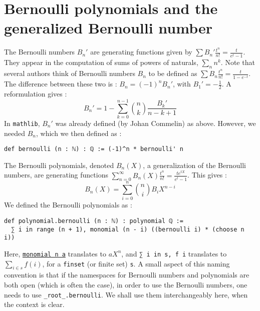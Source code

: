 \documentclass[a4paper,UKenglish,cleveref, autoref, thm-restate,pdfa]{lipics-v2021}
\newcommand{\lean}[1]{\texttt{#1}\xspace} %
\begin{document}
\section{Bernoulli polynomials and the generalized Bernoulli number}
\label{ber}
The Bernoulli numbers $B_n'$ are generating functions given by $\sum B_n'\frac{t^n}{n!}=\frac{t}{e^{t} - 1}$. They appear 
in the computation of sums of powers of naturals, $\sum_n n^k$. Note that several authors think of Bernoulli numbers $B_n$ 
to be defined as $\sum B_n\frac{t^n}{n!}=\frac{t}{1-e^{-t}}$. The difference between these two is : $B_n = (-1)^n B_n'$, 
with $B_1' = - \frac{1}{2}$.
A reformulation gives :
$$ B_n' = 1 - \sum_{k = 0}^{n - 1} {n \choose k} \frac{B_k'}{n - k + 1} $$
In \lean{mathlib}, $B_n'$ was already defined (by Johan Commelin) as above. However, we needed $B_n$, which we then defined as :
\begin{lstlisting}
def bernoulli (n : ℕ) : ℚ := (-1)^n * bernoulli' n
\end{lstlisting}
The Bernoulli polynomials, denoted $B_n(X)$, a generalization of the Bernoulli numbers,
are generating functions $ \sum_{n = 0}^{\infty} B_n(X) \frac{t^n}{n!} = \frac{t e^{tX}}{e^t - 1} $. 
This gives :
$$ B_n (X) = \sum_{i = 0}^n {n \choose i} B_i X^{n - i} $$
We defined the Bernoulli polynomials as : 
\begin{lstlisting}
def polynomial.bernoulli (n : ℕ) : polynomial ℚ :=
  ∑ i in range (n + 1), monomial (n - i) ((bernoulli i) * (choose n i))
\end{lstlisting}
Here, \href{https://leanprover-community.github.io/mathlib_docs/data/polynomial/basic.html#polynomial.monomial}{\lean{monomial n a}} 
translates to $a X^n$, and \lean{∑ i in s, f i} translates to $\sum_{i \in s} f(i)$, for a \lean{finset} (or finite set) \lean{s}. A small aspect of this naming convention is that if the namespaces for Bernoulli numbers and polynomials are both open 
(which is often the case), in order to use the Bernoulli numbers, one needs to use \lean{\_root\_.bernoulli}. 
We shall use them interchangeably here, when the context is clear. 

\end{document}
